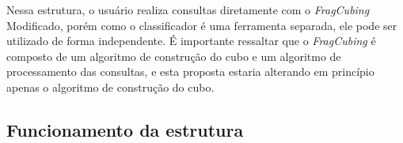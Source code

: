 {Nessa estrutura, o usuário realiza consultas diretamente com o \textit{FragCubing} Modificado, porém como o classificador é uma ferramenta separada, ele pode ser utilizado de forma independente.
É importante ressaltar que o \textit{FragCubing} é composto de um algoritmo de construção do cubo e um algoritmo de processamento das consultas, e esta proposta estaria alterando em princípio apenas o algoritmo de construção do cubo.

{\color{red}
\subsection{Funcionamento da estrutura}\label{ch:prop:cube:func}



}


}
